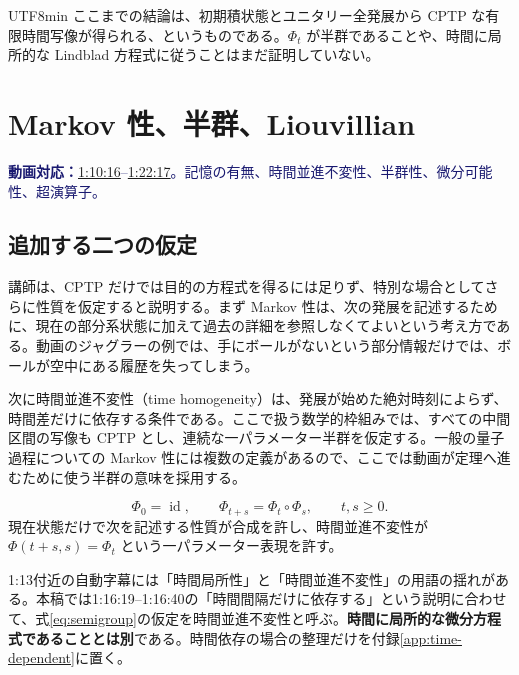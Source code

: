 \documentclass[11pt,a4paper]{article}
\numberwithin{equation}{section}
\newcommand{\id}{\operatorname{id}}
\newcommand{\vid}[2]{\href{https://www.youtube.com/watch?v=3gDSaNy1O7Y\&t=#1s}{#2}}
\newcommand{\source}[1]{\par\noindent\textcolor{MidnightBlue}{\textbf{動画対応：}#1}\par}
\begin{document}
\begin{CJK*}{UTF8}{min}
ここまでの結論は、初期積状態とユニタリー全発展から CPTP な有限時間写像が得られる、というものである。$\Phi_t$ が半群であることや、時間に局所的な Lindblad 方程式に従うことはまだ証明していない。

\section{Markov 性、半群、Liouvillian}
\label{sec:semigroup}
\source{\vid{4216}{1:10:16}--\vid{4937}{1:22:17}。記憶の有無、時間並進不変性、半群性、微分可能性、超演算子。}
\subsection{追加する二つの仮定}
講師は、CPTP だけでは目的の方程式を得るには足りず、特別な場合としてさらに性質を仮定すると説明する。まず Markov 性は、次の発展を記述するために、現在の部分系状態に加えて過去の詳細を参照しなくてよいという考え方である。動画のジャグラーの例では、手にボールがないという部分情報だけでは、ボールが空中にある履歴を失ってしまう。

次に時間並進不変性（time homogeneity）は、発展が始めた絶対時刻によらず、時間差だけに依存する条件である。ここで扱う数学的枠組みでは、すべての中間区間の写像も CPTP とし、連続な一パラメーター半群を仮定する。一般の量子過程についての Markov 性には複数の定義があるので、ここでは動画が定理へ進むために使う半群の意味を採用する。

\begin{equation}
\Phi_0=\id,
\qquad \Phi_{t+s}=\Phi_t\circ\Phi_s,
\qquad t,s\geq0.
\label{eq:semigroup}
\end{equation}
現在状態だけで次を記述する性質が合成を許し、時間並進不変性が $\Phi(t+s,s)=\Phi_t$ という一パラメーター表現を許す。

1:13付近の自動字幕には「時間局所性」と「時間並進不変性」の用語の揺れがある。本稿では1:16:19--1:16:40の「時間間隔だけに依存する」という説明に合わせて、式\eqref{eq:semigroup}の仮定を時間並進不変性と呼ぶ。\textbf{時間に局所的な微分方程式であることとは別}である。時間依存の場合の整理だけを付録\ref{app:time-dependent}に置く。


\end{CJK*}
\end{document}
